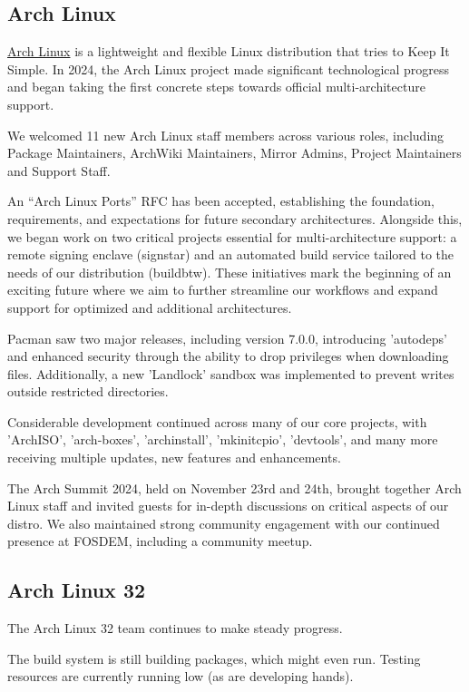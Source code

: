 \documentclass[a4paper]{report}
\begin{document}
\subsection{Arch Linux}

\href{https://archlinux.org/}{Arch Linux} is a lightweight and flexible Linux distribution that tries to Keep It Simple. In 2024, the Arch Linux project made significant technological progress and began taking the first concrete steps towards official multi-architecture support.

We welcomed 11 new Arch Linux staff members across various roles, including Package Maintainers, ArchWiki Maintainers, Mirror Admins, Project Maintainers and Support Staff.

An “Arch Linux Ports” RFC has been accepted, establishing the foundation, requirements, and expectations for future secondary architectures. Alongside this, we began work on two critical projects essential for multi-architecture support: a remote signing enclave (signstar) and an automated build service tailored to the needs of our distribution (buildbtw). These initiatives mark the beginning of an exciting future where we aim to further streamline our workflows and expand support for optimized and additional architectures.

Pacman saw two major releases, including version 7.0.0, introducing 'autodeps' and enhanced security through the ability to drop privileges when downloading files. Additionally, a new 'Landlock' sandbox was implemented to prevent writes outside restricted directories.

Considerable development continued across many of our core projects, with 'ArchISO', 'arch-boxes', 'archinstall', 'mkinitcpio', 'devtools', and many more receiving multiple updates, new features and enhancements.

The Arch Summit 2024, held on November 23rd and 24th, brought together Arch Linux staff and invited guests for in-depth discussions on critical aspects of our distro. We also maintained strong community engagement with our continued presence at FOSDEM, including a community meetup.

\subsection{Arch Linux 32}

The Arch Linux 32 team continues to make steady progress.

The build system is still building packages, which might even run. Testing resources are currently running low (as are developing hands).
\end{document}
